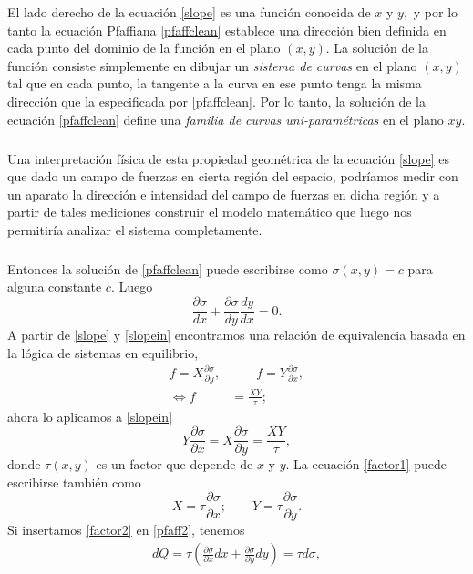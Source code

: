 \documentclass{article}
\theoremstyle{definition} \newtheorem{defi}{Definici\'on}
\theoremstyle{definition} \newtheorem{teo}{Teorema}
\theoremstyle{definition} \newtheorem{cor}{Corolario}
\begin{document}
El lado derecho de la ecuaci\'on \eqref{slope} es una funci\'on conocida de $x$ y $y,$ y por lo tanto la ecuaci\'on Pfaffiana \eqref{pfaffclean} establece una direcci\'on bien definida en cada punto del dominio de la funci\'on en el plano $(x, y).$ La soluci\'on de la funci\'on consiste simplemente en dibujar un \emph{sistema de curvas} en el plano $(x, y)$ tal que en cada punto, la tangente a la curva en ese punto tenga la misma direcci\'on que la especificada por \eqref{pfaffclean}. Por lo tanto, la soluci\'on de la ecuaci\'on \eqref{pfaffclean} define una \emph{familia de curvas uni-param\'etricas} en el plano $xy.$
\subparagraph{}
Una interpretaci\'on f\'isica de esta propiedad geom\'etrica de la ecuaci\'on \eqref{slope} es que dado un campo de fuerzas en cierta regi\'on del espacio, podr\'iamos medir con un aparato la direcci\'on e intensidad del campo de fuerzas en dicha regi\'on y a partir de tales mediciones construir el modelo matem\'atico que luego nos permitir\'ia analizar el sistema completamente.
\subparagraph{}
Entonces la soluci\'on de \eqref{pfaffclean} puede escribirse como $\sigma(x, y) = c$ para alguna constante $c.$ Luego
\begin{equation}\label{slopein}
\frac{\partial \sigma}{dx} + \frac{\partial \sigma}{dy}\frac{dy}{dx} = 0.
\end{equation}
A partir de \eqref{slope} y \eqref{slopein} encontramos una relaci\'on de equivalencia basada en la l\'ogica de sistemas en equilibrio,
\begin{align}
f=X\frac{\partial \sigma}{\partial y}, &\qquad f=Y\frac{\partial \sigma}{\partial x},\\
\Leftrightarrow f&=\frac{XY}{\tau};
\end{align}
ahora lo aplicamos a \eqref{slopein}
\begin{equation}\label{factor1}
Y\frac{\partial \sigma}{\partial x} = X \frac{\partial \sigma}{\partial y} = \frac{XY}{\tau},
\end{equation}
donde $\tau(x, y)$ es un factor que depende de $x$ y $y.$ La ecuaci\'on \eqref{factor1} puede escribirse tambi\'en como
\begin{equation}\label{factor2}
X = \tau \frac{\partial \sigma}{\partial x}; \qquad  Y = \tau \frac{\partial \sigma}{\partial y}.
\end{equation}
Si insertamos \eqref{factor2} en \eqref{pfaff2}, tenemos
\begin{align}
dQ = \tau \left( \frac{\partial{\sigma}}{\partial{x}}dx + \frac{\partial{\sigma}}{\partial{y}}dy \right) = \tau d\sigma, 
\end{align}
\end{document}
